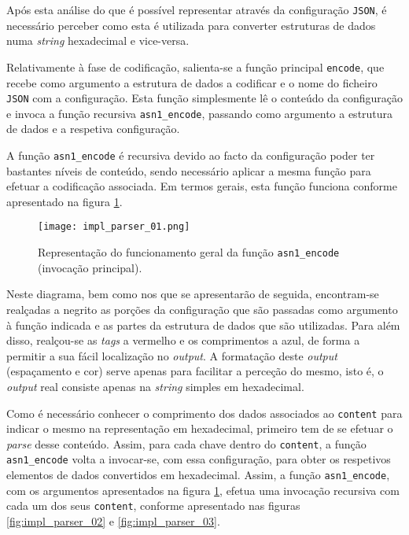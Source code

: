 Após esta análise do que é possível representar através da configuração \texttt{JSON}, é necessário perceber como esta é utilizada para converter estruturas de dados numa \textit{string} hexadecimal e vice-versa.

Relativamente à fase de codificação, salienta-se a função principal \texttt{encode}, que recebe como argumento a estrutura de dados a codificar e o nome do ficheiro \texttt{JSON} com a configuração. Esta função simplesmente lê o conteúdo da configuração e invoca a função recursiva \texttt{asn1\_encode}, passando como argumento a estrutura de dados e a respetiva configuração.

A função \texttt{asn1\_encode} é recursiva devido ao facto da configuração poder ter bastantes níveis de conteúdo, sendo necessário aplicar a mesma função para efetuar a codificação associada. Em termos gerais, esta função funciona conforme apresentado na figura \ref{fig:impl_parser_01}.

\begin{figure}[H]
    \centering
    \texttt{[image: impl\_parser\_01.png]}
    \caption{Representação do funcionamento geral da função \texttt{asn1\_encode} (invocação principal).}
    \label{fig:impl_parser_01}
\end{figure}

Neste diagrama, bem como nos que se apresentarão de seguida, encontram-se realçadas a negrito as porções da configuração que são passadas como argumento à função indicada e as partes da estrutura de dados que são utilizadas. Para além disso, realçou-se as \textit{tags} a vermelho e os comprimentos a azul, de forma a permitir a sua fácil localização no \textit{output}. A formatação deste \textit{output} (espaçamento e cor) serve apenas para facilitar a perceção do mesmo, isto é, o \textit{output} real consiste apenas na \textit{string} simples em hexadecimal.

Como é necessário conhecer o comprimento dos dados associados ao \texttt{content} para indicar o mesmo na representação em hexadecimal, primeiro tem de se efetuar o \textit{parse} desse conteúdo. Assim, para cada chave dentro do \texttt{content}, a função \texttt{asn1\_encode} volta a invocar-se, com essa configuração, para obter os respetivos elementos de dados convertidos em hexadecimal. Assim, a função \texttt{asn1\_encode}, com os argumentos apresentados na figura \ref{fig:impl_parser_01}, efetua uma invocação recursiva com cada um dos seus \texttt{content}, conforme apresentado nas figuras \ref{fig:impl_parser_02} e \ref{fig:impl_parser_03}.

